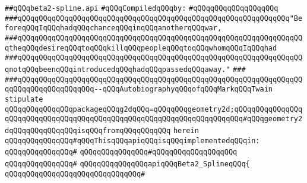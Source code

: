 \label{src/lib/x-kit/draw/beta2-spline.api}
\verb|##qQQqbeta2-spline.api|\newline
\newline
\verb|#qQQqCompiledqQQqby:|\newline
\verb|#qQQqqQQqqQQqqQQqqQQq|\newline
\newline
\newline
\newline
\verb|###qQQqqQQqqQQqqQQqqQQqqQQqqQQqqQQqqQQqqQQqqQQqqQQqqQQqqQQqqQQqqQQq"BeforeqQQqIqQQqhadqQQqchanceqQQqinqQQqanotherqQQqwar,|\newline
\verb|###qQQqqQQqqQQqqQQqqQQqqQQqqQQqqQQqqQQqqQQqqQQqqQQqqQQqqQQqqQQqqQQqqQQqtheqQQqdesireqQQqtoqQQqkillqQQqpeopleqQQqtoqQQqwhomqQQqIqQQqhad|\newline
\verb|###qQQqqQQqqQQqqQQqqQQqqQQqqQQqqQQqqQQqqQQqqQQqqQQqqQQqqQQqqQQqqQQqqQQqnotqQQqbeenqQQqintroducedqQQqhadqQQqpassedqQQqaway."|\newline
\verb|###|\newline
\verb|###qQQqqQQqqQQqqQQqqQQqqQQqqQQqqQQqqQQqqQQqqQQqqQQqqQQqqQQqqQQqqQQqqQQqqQQqqQQqqQQqqQQqqQQq--qQQqAutobiographyqQQqofqQQqMarkqQQqTwain|\newline
\newline
\newline
\verb|stipulate|\newline
\verb|qQQqqQQqqQQqqQQqpackageqQQqg2dqQQq=qQQqqQQqgeometry2d;qQQqqQQqqQQqqQQqqQQqqQQqqQQqqQQqqQQqqQQqqQQqqQQqqQQqqQQqqQQqqQQqqQQqqQQq#qQQqgeometry2dqQQqqQQqqQQqqQQqisqQQqfromqQQqqQQqqQQq|\newline
\verb|herein|\newline
\newline
\verb|qQQqqQQqqQQqqQQq#qQQqThisqQQqapiqQQqisqQQqimplementedqQQqin:|\newline
\verb|qQQqqQQqqQQqqQQq#|\newline
\verb|qQQqqQQqqQQqqQQq#qQQqqQQqqQQqqQQqqQQq|\newline
\verb|qQQqqQQqqQQqqQQq#|\newline
\verb|qQQqqQQqqQQqqQQqapiqQQqBeta2_SplineqQQq{|\newline
\verb|qQQqqQQqqQQqqQQqqQQqqQQqqQQqqQQq#|\newline
\newline
